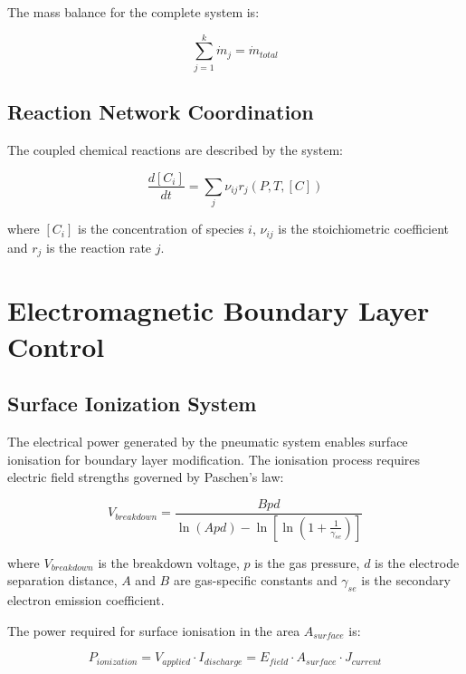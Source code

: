 \documentclass[12pt,a4paper]{article}
\begin{document}
The mass balance for the complete system is:

\begin{equation}
\sum_{j=1}^{k} \dot{m}_j = \dot{m}_{total}
\end{equation}

\subsection{Reaction Network Coordination}

The coupled chemical reactions are described by the system:

\begin{equation}
\frac{d[C_i]}{dt} = \sum_{j} \nu_{ij} r_j(P, T, [C])
\end{equation}

where $[C_i]$ is the concentration of species $i$, $\nu_{ij}$ is the stoichiometric coefficient and $r_j$ is the reaction rate $j$.

\section{Electromagnetic Boundary Layer Control}

\subsection{Surface Ionization System}

The electrical power generated by the pneumatic system enables surface ionisation for boundary layer modification. The ionisation process requires electric field strengths governed by Paschen's law:

\begin{equation}
V_{breakdown} = \frac{Bpd}{\ln(Apd) - \ln\left[\ln\left(1 + \frac{1}{\gamma_{se}}\right)\right]}
\end{equation}

where $V_{breakdown}$ is the breakdown voltage, $p$ is the gas pressure, $d$ is the electrode separation distance, $A$ and $B$ are gas-specific constants and $\gamma_{se}$ is the secondary electron emission coefficient.

The power required for surface ionisation in the area $A_{surface}$ is:

\begin{equation}
P_{ionization} = V_{applied} \cdot I_{discharge} = E_{field} \cdot A_{surface} \cdot J_{current}
\end{equation}
\end{document}
